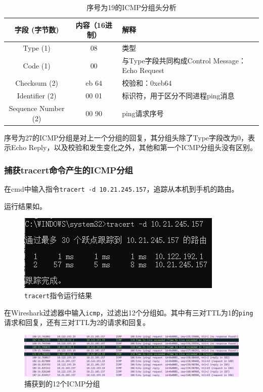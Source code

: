 \documentclass[lang=cn,11pt,a4paper,cite=authornum]{paper}
\begin{document}
\begin{table}[!htbp]
    \centering
    \caption{序号为19的ICMP分组头分析\label{tab:icmp1res}}
    \begin{tabular}{|c|c|l|}
        \hline
        字段 (字节数) & 内容（16进制） & 解释 \\
        \hline
        Type (1) & 08 & 类型 \\
        \hline
        Code (1) & 00 & 与Type字段共同构成Control Message：Echo Request \\
        \hline
        Checksum (2) & eb 64 & 校验和：0xeb64 \\
        \hline
        Identifier (2) & 00 01 & 标识符，用于区分不同进程ping消息 \\
        \hline
        Sequence Number (2) & 00 90 & ping请求序号 \\
        \hline
    \end{tabular}
\end{table}

序号为27的ICMP分组是对上一个分组的回复，其分组头除了Type字段改为0，表示Echo Reply，以及校验和发生变化之外，其他和第一个ICMP分组头没有区别。

\subsubsection{捕获tracert命令产生的ICMP分组}

在cmd中输入指令\texttt{tracert -d 10.21.245.157}，追踪从本机到手机的路由。

运行结果如。

\begin{figure}[htbp]
    \centering
    \includegraphics[width=0.5\linewidth]{./Images/tracert.png}
    \caption{\texttt{tracert}指令运行结果\label{fig:tracert}}
\end{figure}

在Wireshark过滤器中输入\texttt{icmp}，过滤出12个分组如。其中有三对TTL为1的\texttt{ping}请求和回复，还有三对TTL为2的请求和回复。

\begin{figure}[htbp]
    \centering
    \includegraphics[width=\linewidth]{./Images/ICMP.png}
    \caption{捕获到的12个ICMP分组\label{fig:icmps}}
\end{figure}
\end{document}
